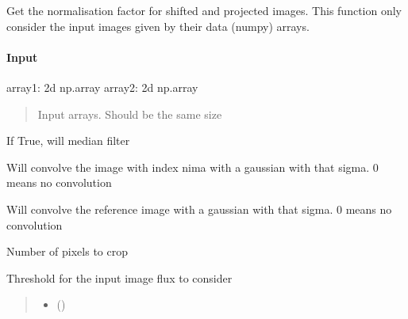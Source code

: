 \documentclass[letterpaper,10pt,english]{sphinxmanual}
\begin{document}
\begin{fulllineitems}
\label{\detokenize{api/pymusepipe:pymusepipe.util_image.get_normfactor}}
\pysigstartsignatures
{}
\pysigstopsignatures
\sphinxAtStartPar
Get the normalisation factor for shifted and projected images. This function
only consider the input images given by their data (numpy) arrays.


\paragraph{Input}
\label{\detokenize{api/pymusepipe:id149}}
\sphinxAtStartPar
array1: 2d np.array
array2: 2d np.array
\begin{quote}

\sphinxAtStartPar
Input arrays. Should be the same size
\end{quote}
\begin{description}
\sphinxAtStartPar
If True, will median filter

\sphinxAtStartPar
Will convolve the image with index nima
with a gaussian with that sigma. 0 means no convolution

\sphinxAtStartPar
Will convolve the reference image
with a gaussian with that sigma. 0 means no convolution

\sphinxAtStartPar
Number of pixels to crop

\sphinxAtStartPar
Threshold for the input image flux to consider

\end{description}
\begin{quote}\begin{description}
\begin{itemize}
\item {} 
\sphinxAtStartPar
{} ()


\end{itemize}
\end{description}
\end{quote}
\end{fulllineitems}
\end{document}
